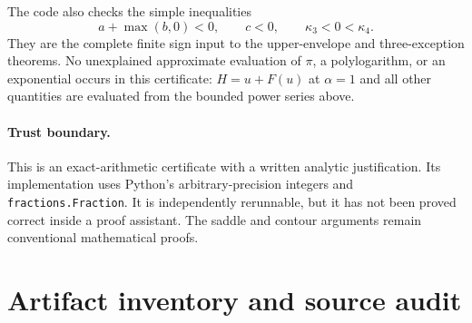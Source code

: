 \documentclass[11pt,a4paper]{article}
\numberwithin{equation}{section}
\theoremstyle{definition}
\theoremstyle{remark}
\begin{document}
The code also checks the simple inequalities
\[
 a+\max(b,0)<0,\qquad c<0,\qquad \kappa_3<0<\kappa_4.
\]
They are the complete finite sign input to the upper-envelope and
three-exception theorems. No unexplained approximate evaluation of
$\pi$, a polylogarithm, or an exponential occurs in this certificate:
$H=u+F(u)$ at $\alpha=1$ and all other quantities are evaluated from the
bounded power series above.

\paragraph{Trust boundary.}
This is an exact-arithmetic certificate with a written analytic
justification. Its implementation uses Python's arbitrary-precision
integers and \texttt{fractions.Fraction}. It is independently rerunnable,
but it has not been proved correct inside a proof assistant. The saddle
and contour arguments remain conventional mathematical proofs.

\section{Artifact inventory and source audit}
\label{srp:sec:artifacts}
\end{document}
